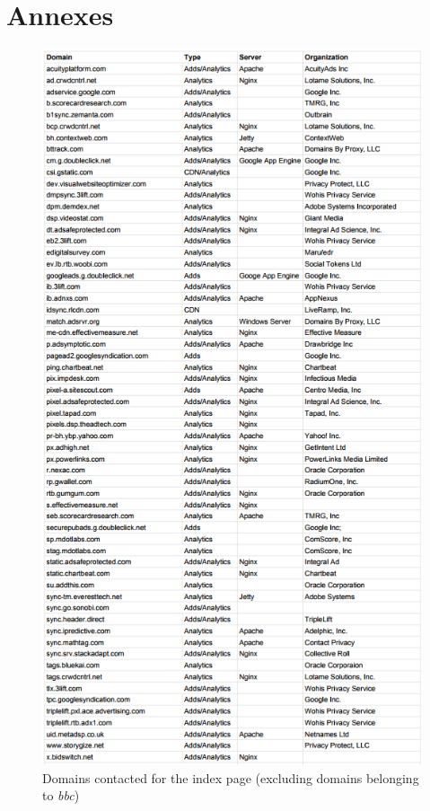 \documentclass[conference]{IEEEtran}
\begin{document}
\section{Annexes}
\begin{figure}
\caption{Domains contacted for the index page (excluding domains belonging to \textit{bbc})}
\includegraphics[width=\linewidth]{domains.png}
\end{figure}
\end{document}
